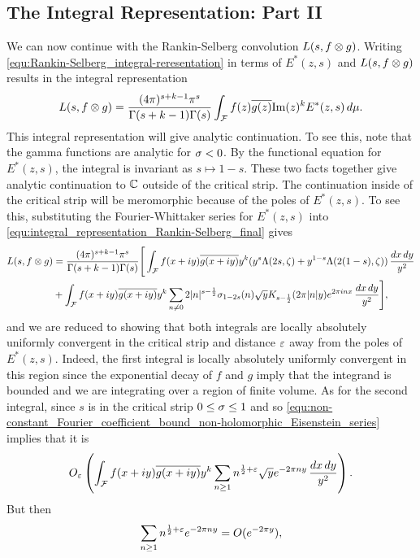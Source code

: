     \subsection*{The Integral Representation: Part II}
      We can now continue with the Rankin-Selberg convolution $L(s,f \otimes g)$. Writing \cref{equ:Rankin-Selberg_integral-reresentation} in terms of $E^{\ast}(z,s)$ and $L(s,f \otimes g)$ results in the integral representation
      \begin{equation}\label{equ:integral_representation_Rankin-Selberg_final}
        L(s,f \otimes g) = \frac{(4\pi)^{s+k-1}\pi^{s}}{\Gamma(s+k-1)\Gamma(s)}\int_{\mathcal{F}}f(z)\overline{g(z)}\mathrm{Im}(z)^{k}E^{\ast}(z,s)\,d\mu.
      \end{equation}
      This integral representation will give analytic continuation. To see this, note that the gamma functions are analytic for $\sigma < 0$. By the functional equation for $E^{\ast}(z,s)$, the integral is invariant as $s \mapsto 1-s$. These two facts together give analytic continuation to $\mathbb{C}$ outside of the critical strip. The continuation inside of the critical strip will be meromorphic because of the poles of $E^{\ast}(z,s)$. To see this, substituting the Fourier-Whittaker series for $E^{\ast}(z,s)$ into \cref{equ:integral_representation_Rankin-Selberg_final} gives
      \begin{align*}
        L(s,f \otimes g) &= \frac{(4\pi)^{s+k-1}\pi^{s}}{\Gamma(s+k-1)\Gamma(s)}\Bigg[\int_{\mathcal{F}}f(x+iy)\overline{g(x+iy)}y^{k}(y^{s}\Lambda(2s,\zeta)+y^{1-s}\Lambda(2(1-s),\zeta))\,\frac{dx\,dy}{y^{2}} \\
        &+\int_{\mathcal{F}}f(x+iy)\overline{g(x+iy)}y^{k}\sum_{n \neq 0}2|n|^{s-\frac{1}{2}}\sigma_{1-2s}(n)\sqrt{y}K_{s-\frac{1}{2}}(2\pi|n|y)e^{2\pi inx}\,\frac{dx\,dy}{y^{2}}\Bigg],
      \end{align*}
      and we are reduced to showing that both integrals are locally absolutely uniformly convergent in the critical strip and distance $\varepsilon$ away from the poles of $E^{\ast}(z,s)$. Indeed, the first integral is locally absolutely uniformly convergent in this region since the exponential decay of $f$ and $g$ imply that the integrand is bounded and we are integrating over a region of finite volume. As for the second integral, since $s$ is in the critical strip $0 \le \sigma \le 1$ and so \cref{equ:non-constant_Fourier_coefficient_bound_non-holomorphic_Eisenstein_series} implies that it is
      \[
        O_{\varepsilon}\left(\int_{\mathcal{F}}f(x+iy)\overline{g(x+iy)}y^{k}\sum_{n \ge 1}n^{\frac{1}{2}+\varepsilon}\sqrt{y}e^{-2\pi ny}\,\frac{dx\,dy}{y^{2}}\right).
      \]
      But then
      \[
        \sum_{n \ge 1}n^{\frac{1}{2}+\varepsilon}e^{-2\pi ny} = O(e^{-2\pi y}),
      \]
